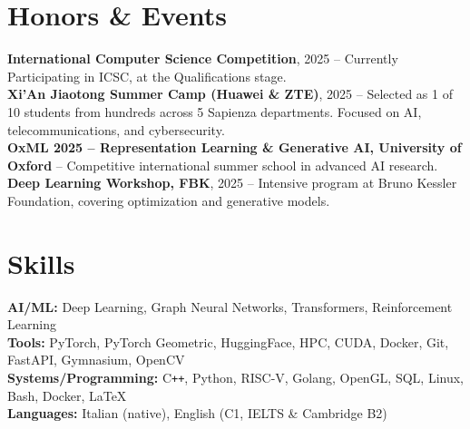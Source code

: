 \documentclass[a4paper,10pt]{article}
\begin{document}
\section*{Honors \& Events}
\noindent
\textbf{International Computer Science Competition}, 2025 -- Currently Participating in ICSC, at the Qualifications stage. \\
\textbf{Xi’An Jiaotong Summer Camp (Huawei \& ZTE)}, 2025 -- Selected as 1 of 10 students from hundreds across 5 Sapienza departments. Focused on AI, telecommunications, and cybersecurity. \\
\textbf{OxML 2025 – Representation Learning \& Generative AI, University of Oxford} -- Competitive international summer school in advanced AI research. \\
\textbf{Deep Learning Workshop, FBK}, 2025 -- Intensive program at Bruno Kessler Foundation, covering optimization and generative models.

\section*{Skills}
\noindent
\textbf{AI/ML:} Deep Learning, Graph Neural Networks, Transformers, Reinforcement Learning \\
\textbf{Tools:}  PyTorch, PyTorch Geometric, HuggingFace, HPC, CUDA, Docker, Git, FastAPI, Gymnasium, OpenCV\\
\textbf{Systems/Programming:} C\texttt{++}, Python, RISC-V, Golang, OpenGL, SQL, Linux, Bash, Docker, \LaTeX\\
\textbf{Languages:} Italian (native), English (C1, IELTS \& Cambridge B2)
\end{document}

